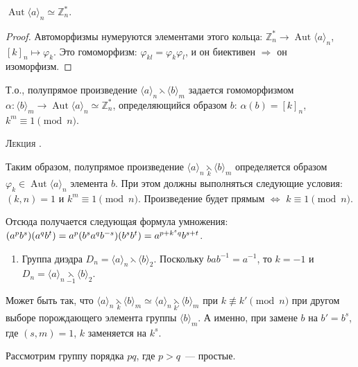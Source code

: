 \documentclass[a4paper]{article}
\newcounter{lec}
\renewcommand{\thelec}{\Roman{lec}}
\newcommand*{\lecture}[1]{\refstepcounter{lec}\vspace{20pt}
\begin{center}{\rmfamily\textsc{Лекция \thelec. \\ \textbf{#1}}}\vspace{5pt}
\end{center}}
\renewcommand{\Aut}{\mathop{\mathrm{Aut}}\nolimits}
\newcommand*{\p}[1]{#1\nobreak\discretionary{}{\hbox{$\mathsurround=0pt #1$}}{}}
\begin{document}
\begin{imp}
$\Aut \langle a\rangle_n\simeq \mathbb{Z}_n^*$.
\end{imp}

\begin{proof}
Автоморфизмы нумеруются элементами этого кольца: $\mathbb{Z}_n^*\to
\Aut\langle a\rangle_n$, $[k]_n\mapsto \varphi_k$. Это гомоморфизм:
$\varphi_{kl}=\varphi_k\varphi_l$, и он биективен $\Rightarrow$ он
изоморфизм.
\end{proof}

Т.о., полупрямое произведение $\langle
a\rangle_n\leftthreetimes\langle b\rangle_m$ задается гомоморфизмом
$\alpha\colon \langle b\rangle_m\to \Aut \langle a\rangle_n\simeq
\mathbb{Z}_n^*$, определяющийся образом $b$: $\alpha(b)=[k]_n$,
$k^m\equiv 1\pmod{n}$.
\lecture{}

Таким образом, полупрямое произведение $\langle
a\rangle_n\mathop{\leftthreetimes}\limits_k\langle b\rangle_m$
определяется образом $\varphi_k\in\Aut\langle a\rangle_n$ элемента
$b$. При этом должны выполняться следующие условия: $(k,n)=1$ и
$k^m\equiv 1\pmod{n}$. Произведение будет прямым $\Leftrightarrow$
$k\equiv 1\pmod{n}$.

Отсюда получается следующая формула умножения:
$(a^pb^s)(a^qb^t)\p=a^p(b^sa^qb^{-s})(b^sb^t)=a^{p+k^sq}b^{s+t}$.

\begin{ex}
\begin{enumerate}
  \item Группа диэдра $D_n=\langle a\rangle_n\leftthreetimes \langle
  b\rangle_2$. Поскольку $bab^{-1}=a^{-1}$, то $k=-1$ и $D_n=\langle a\rangle_n
  \mathop{\leftthreetimes}\limits_{-1} \langle b\rangle_2$.
\end{enumerate}
\end{ex}

\begin{note}
Может быть так, что $\langle
a\rangle_n\mathop{\leftthreetimes}\limits_{k}\langle
b\rangle_m\simeq \langle
a\rangle_n\mathop{\leftthreetimes}\limits_{k'}\langle b\rangle_m$
при $k\not\equiv k'\pmod{n}$ при другом выборе порождающего элемента
группы $\langle b\rangle_m$. А именно, при замене $b$ на $b'=b^s$,
где $(s,m)=1$, $k$ заменяется на $k^s$.
\end{note}

Рассмотрим группу порядка $pq$, где $p>q$~--- простые.
\end{document}
